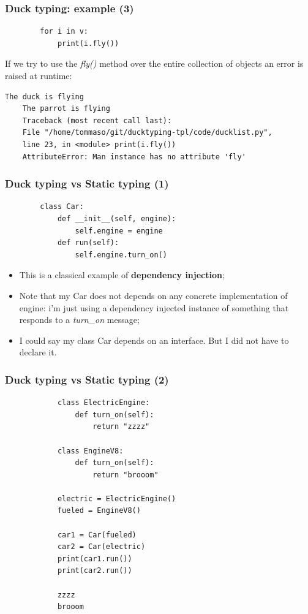 \documentclass[xcolor ={table,usenames,dvipsnames}]{beamer}
\theoremstyle{definition}
\begin{document}
	\begin{frame}[fragile]
		\frametitle{Duck typing: example (3)}
		\begin{lstlisting}	
		for i in v:
			print(i.fly())
		\end{lstlisting}
		If we try to use the \textit{fly()} method  over the entire collection of objects an error is raised at runtime:
			\begin{lstlisting}[keywordstyle=\color{black},
		commentstyle=\color{black},
	stringstyle=\color{black}.]	
	The duck is flying
	The parrot is flying
	Traceback (most recent call last):
	File "/home/tommaso/git/ducktyping-tpl/code/ducklist.py", 
	line 23, in <module> print(i.fly())
	AttributeError: Man instance has no attribute 'fly'
		\end{lstlisting}
	\end{frame}

	\begin{frame}[fragile]
		\frametitle{Duck typing vs Static typing (1)}
		\begin{lstlisting}
		class Car:
			def __init__(self, engine):
				self.engine = engine
			def run(self):
				self.engine.turn_on()			
		\end{lstlisting}
		
		\begin{itemize}
			\item This is a classical example of \textbf{dependency injection};
			\item Note that my Car does not depends on any concrete implementation of engine: i'm just using a dependency injected instance of something that responds to a \textit{turn\_on} message;
			\item I could say my class Car depends on an interface. But I did not have to declare it. %
		\end{itemize}	
	\end{frame}
	
	\begin{frame}[fragile]
		\frametitle{Duck typing vs Static typing (2)}
		\begin{lstlisting}
			class ElectricEngine:
				def turn_on(self):
					return "zzzz"
			
			class EngineV8:
				def turn_on(self):
					return "brooom"
			
			electric = ElectricEngine()
			fueled = EngineV8()
			
			car1 = Car(fueled)
			car2 = Car(electric)
			print(car1.run())
			print(car2.run())
			
			zzzz
			brooom
		\end{lstlisting}
	\end{frame}
	
\end{document}
